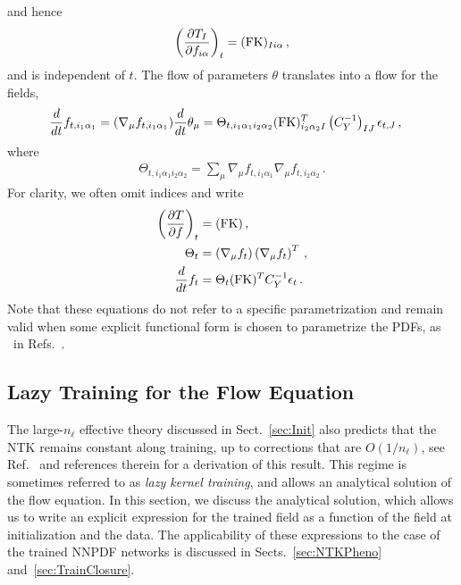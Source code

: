 and hence
\begin{align}
    \label{eq:dTbydf}
    \left(\frac{\partial T_I}{\partial f_{i\alpha}}\right)_t =
        (\mathrm{FK})_{Ii\alpha}\, ,
\end{align}
and is independent of $t$. The flow of parameters $\theta$ translates into a flow for the fields,
\begin{align}
    \label{eq:NTKFlow}
    \frac{d}{dt} &f_{t,i_1\alpha_1} = (\nabla_\mu f_{t,i_1\alpha_1}) \frac{d}{dt} \theta_\mu =
      \Theta_{t,i_1\alpha_1i_2\alpha_2}
      (\mathrm{FK})^T_{i_2\alpha_2I} \left(C_Y^{-1}\right)_{IJ} \epsilon_{t,J}\, ,
\end{align}
where
\begin{align}
    \label{eq:NTKDef}
    \Theta_{t,i_1\alpha_1i_2\alpha_2} = \sum_\mu
    \nabla_\mu f_{t,i_1\alpha_1} \nabla_\mu f_{t,i_2\alpha_2}\, .
\end{align}
For clarity, we often omit indices and write
\begin{align}
    \label{eq:dTdfForLinearObs}
    \left(\frac{\partial T}{\partial f}\right)_t
        &= (\mathrm{FK})\, , \\
    \label{eq:NTKDefNoIndices}
    \Theta_t
        &= \left(\nabla_\mu f_t\right) \left(\nabla_\mu f_t\right)^T\, , \\
    \label{eq:FlowEquationNoIndices}
    \frac{d}{dt} f_t
        &= \Theta_t (\mathrm{FK})^T C_Y^{-1} \epsilon_t\, .
\end{align}
Note that these equations do not refer to a specific parametrization and remain valid when some
explicit functional form is chosen to parametrize the PDFs, as \eg\ in
Refs.~\cite{Bailey:2020ooq,Hou:2019efy}.

\subsection{Lazy Training for the Flow Equation}
\label{sec:Lazy}

The large-$n_{\ell}$ effective theory discussed in Sect.~\ref{sec:Init} also predicts that
the NTK remains constant along training, up to corrections that are $O(1/n_{\ell})$, see
Ref.~\cite{DBLP:journals/corr/abs-1806-07572} and references therein for a derivation of this result.
This regime is sometimes referred to as {\em lazy kernel training}, and allows an analytical
solution of the flow equation. In this section, we discuss the analytical solution, which allows us 
to write an explicit expression for the trained field as a function of the field at initialization and the data. 
The applicability of these expressions to the case of the trained NNPDF networks is discussed in 
Sects.~\ref{sec:NTKPheno} and~\ref{sec:TrainClosure}.

